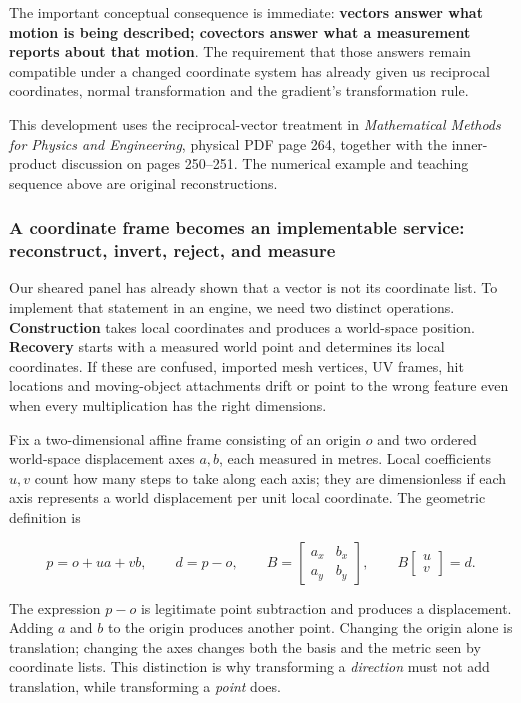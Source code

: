The important conceptual consequence is immediate: \textbf{vectors answer what motion is being described; covectors answer what a measurement reports about that motion}. The requirement that those answers remain compatible under a changed coordinate system has already given us reciprocal coordinates, normal transformation and the gradient's transformation rule.

This development uses the reciprocal-vector treatment in \emph{Mathematical Methods for Physics and Engineering}, physical PDF page 264, together with the inner-product discussion on pages 250--251. The numerical example and teaching sequence above are original reconstructions.

\subsubsection{A coordinate frame becomes an implementable service: reconstruct, invert, reject, and measure}\label{01-foundations-i-ch017-a-coordinate-frame-becomes-an-implementable-service-reconstruct-invert-reject-and-measure}

Our sheared panel has already shown that a vector is not its coordinate list. To implement that statement in an engine, we need two distinct operations. \textbf{Construction} takes local coordinates and produces a world-space position. \textbf{Recovery} starts with a measured world point and determines its local coordinates. If these are confused, imported mesh vertices, UV frames, hit locations and moving-object attachments drift or point to the wrong feature even when every multiplication has the right dimensions.

Fix a two-dimensional affine frame consisting of an origin \(o\) and two ordered world-space displacement axes \(a,b\), each measured in metres. Local coefficients \(u,v\) count how many steps to take along each axis; they are dimensionless if each axis represents a world displacement per unit local coordinate. The geometric definition is

\[
p=o+ua+vb,\qquad d=p-o,\qquad
B=\begin{bmatrix}a_x&b_x\\a_y&b_y\end{bmatrix},\qquad
B\begin{bmatrix}u\\v\end{bmatrix}=d.
\]

The expression \(p-o\) is legitimate point subtraction and produces a displacement. Adding \(a\) and \(b\) to the origin produces another point. Changing the origin alone is translation; changing the axes changes both the basis and the metric seen by coordinate lists. This distinction is why transforming a \emph{direction} must not add translation, while transforming a \emph{point} does.

